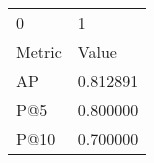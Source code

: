 \begin{tabular}{ll}
0 & 1 \\
Metric & Value \\
AP & 0.812891 \\
P@5 & 0.800000 \\
P@10 & 0.700000 \\
\end{tabular}
